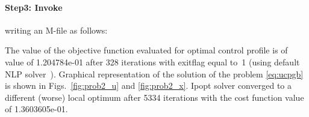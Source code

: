 \paragraph{Step3: Invoke~} writing an M-file
 as follows: 

{\small }

The value of the objective function evaluated for optimal control
profile is of value of 1.204784e-01 after 328 iterations with exitflag
equal to~1 (using default NLP solver~). Graphical
representation of the solution of the problem \eqref{eq:ucpgb} is
shown in Figs.~\ref{fig:prob2_u} and \ref{fig:prob2_x}. Ipopt solver
converged to a different (worse) local optimum after 5334 iterations
with the cost function value of 1.3603605e-01.


